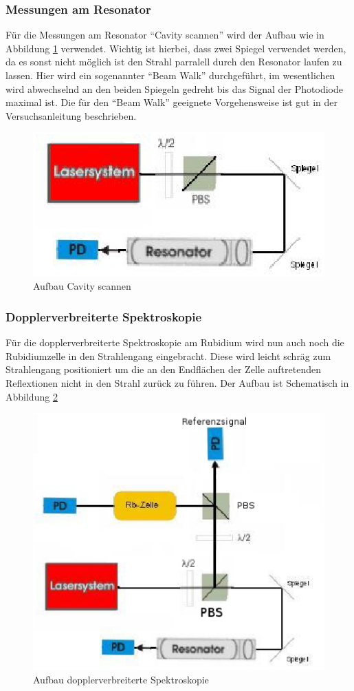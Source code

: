 \documentclass[12pt]{article}
\begin{document}
\subsubsection{Messungen am Resonator}
Für die Messungen am Resonator ``Cavity scannen'' wird der Aufbau wie in Abbildung \ref{skizze-cavity} verwendet. Wichtig ist hierbei, dass zwei Spiegel verwendet werden, da es sonst nicht möglich ist den Strahl parralell durch den Resonator laufen zu lassen. Hier wird ein sogenannter ``Beam Walk'' durchgeführt, im wesentlichen wird abwechselnd an den beiden Spiegeln gedreht bis das Signal der Photodiode maximal ist. Die für den ``Beam Walk'' geeignete Vorgehensweise ist gut in der Versuchsanleitung beschrieben.
\begin{figure}[H]
 \includegraphics[width=0.9\linewidth]{pictures/experiment_am_resonator.eps}
 \caption{Aufbau Cavity scannen}
 \label{skizze-cavity}
\end{figure}
\subsubsection{Dopplerverbreiterte Spektroskopie}
Für die dopplerverbreiterte Spektroskopie am Rubidium wird nun auch noch die Rubidiumzelle in den Strahlengang eingebracht.
Diese wird leicht schräg zum Strahlengang positioniert um die an den Endflächen der Zelle auftretenden Reflextionen nicht in den Strahl zurück zu führen. Der Aufbau ist Schematisch in Abbildung \ref{skizze-dopplerbreit}
\begin{figure}[H]
 \includegraphics[width=0.9\linewidth]{pictures/aufbau_doppler.eps}
 \caption{Aufbau dopplerverbreiterte Spektroskopie}
 \label{skizze-dopplerbreit}
\end{figure}
\end{document}
